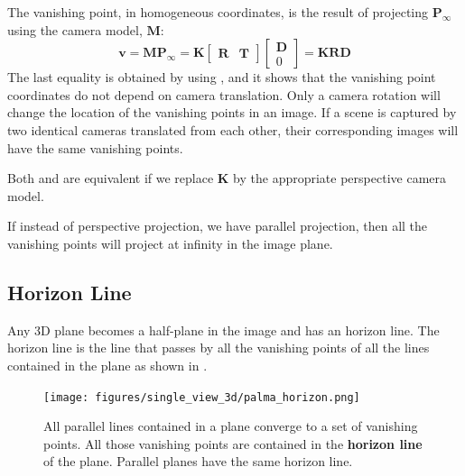The vanishing point, in homogeneous coordinates, is the result of projecting $\mathbf{P}_\infty$ using the camera model, $\mathbf{M}$:
\begin{equation}
    \mathbf{v} = 
    \mathbf{M} 
    \mathbf{P}_\infty 
    = 
    \mathbf{K} 
    \begin{bmatrix}
    \mathbf{R} & \mathbf{T} 
    \end{bmatrix}
    \begin{bmatrix}
    \mathbf{D}\\
    0
    \end{bmatrix}
    = 
    \mathbf{K} \mathbf{R} \mathbf{D}
\label{eq:vanishing_projection}
\end{equation}
The last equality is obtained by using \eqn{\ref{eq:extrinsic}}, and it shows that the vanishing point coordinates do not depend on camera translation. Only a camera rotation will change the location of the vanishing points in an image. If a scene is captured by two identical cameras translated from each other, their corresponding images will have the same vanishing points. 

Both \eqn{\ref{eq:vanishingpoint}} and \eqn{\ref{eq:vanishing_projection}}
are equivalent if we replace $\mathbf{K}$ by the appropriate perspective camera model.
 
If instead of perspective projection, we have parallel projection, then all the vanishing points will project at infinity in the image plane. 



\subsection{Horizon Line}


Any 3D plane becomes a half-plane in the image and has an horizon line. The horizon line is the line that passes by all the vanishing points of all the lines contained in the plane as shown in \fig{\ref{fig:palma_horizon}}.



\begin{figure}
\centerline{
\texttt{[image: figures/single\_view\_3d/palma\_horizon.png]}
}
\caption{All parallel lines contained in a plane converge to a set of vanishing points. All those vanishing points are contained in the {\bf horizon line} of the plane. Parallel planes have the same horizon line.}
\label{fig:palma_horizon}
\end{figure}

